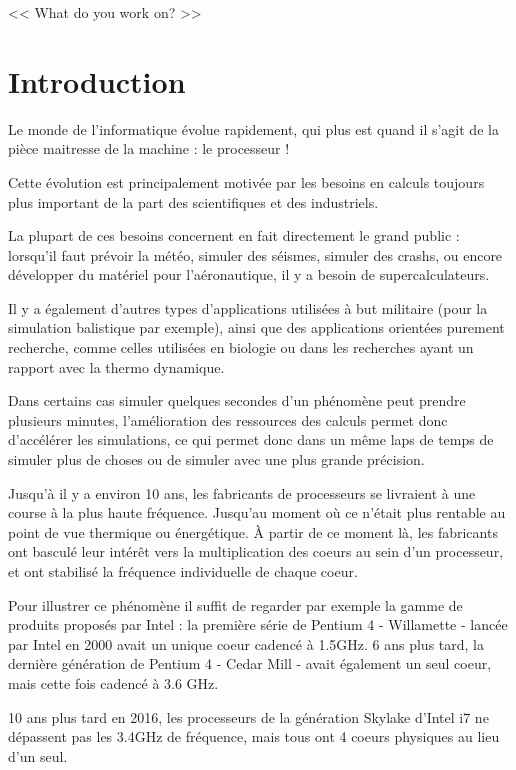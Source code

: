 \begin{savequote}[6cm]
<< What do you work on?  >>
\end{savequote}
\chapter{Introduction}
\chaptertoc

Le monde de l'informatique évolue rapidement, qui plus est quand il s'agit de la pièce maitresse de la machine : le processeur !

Cette évolution est principalement motivée par les besoins en calculs toujours plus important de la part des scientifiques et des industriels.

La plupart de ces besoins concernent en fait directement le grand public : lorsqu'il faut prévoir la météo, simuler des séismes, simuler des crashs, ou encore développer du matériel pour l'aéronautique, il y a besoin de supercalculateurs.

Il y a également d'autres types d'applications utilisées à but militaire (pour la simulation balistique par exemple), ainsi que des applications orientées purement recherche, comme celles utilisées en biologie ou dans les recherches ayant un rapport avec la thermo dynamique.

Dans certains cas simuler quelques secondes d'un phénomène peut prendre plusieurs minutes, l'amélioration des ressources des calculs permet donc d'accélérer les simulations, ce qui permet donc dans un même laps de temps de simuler plus de choses ou de simuler avec une plus grande précision.

Jusqu'à il y a environ 10 ans, les fabricants de processeurs se livraient à une course à la plus haute fréquence.
Jusqu'au moment où ce n'était plus rentable au point de vue thermique ou énergétique. À partir de ce moment là, les fabricants ont basculé leur intérêt vers la multiplication des coeurs au sein d'un processeur, et ont stabilisé la fréquence individuelle de chaque coeur.

Pour illustrer ce phénomène il suffit de regarder par exemple la gamme de produits proposés par Intel : la première série de Pentium 4 - Willamette - lancée par Intel en 2000 avait un unique coeur cadencé à 1.5GHz. 6 ans plus tard, la dernière génération de Pentium 4 - Cedar Mill - avait également un seul coeur, mais cette fois cadencé à 3.6 GHz.

10 ans plus tard en 2016, les processeurs de la génération Skylake d'Intel i7 ne dépassent pas les 3.4GHz de fréquence, mais tous ont 4 coeurs physiques au lieu d'un seul.

